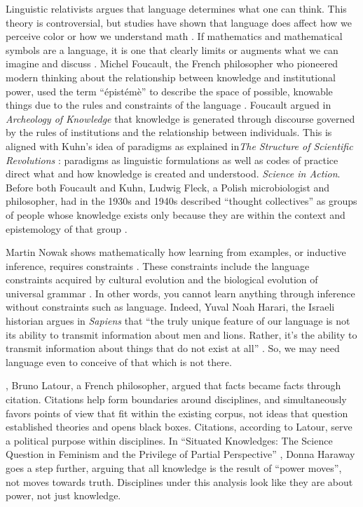 Linguistic relativists argues that language determines what one can think. This theory is controversial, but studies have shown that language does affect how we perceive color \cite{kay_paul_what_2009} or how we understand math \cite{everett_linguistic_2011, holden_life_2004}. If mathematics and mathematical symbols are a language, it is one that clearly limits or augments what we can imagine and discuss \cite{saxe_cultural_2012}. Michel Foucault, the French philosopher who pioneered modern thinking about the relationship between knowledge and institutional power, used the term ``épistémè'' to describe the space of possible, knowable things due to the rules and constraints of the language \cite{foucault_order_2002}. Foucault argued in \emph{Archeology of Knowledge} \cite{foucault_archaeology_2002} that knowledge is generated through discourse governed by the rules of institutions and the relationship between individuals. This is aligned with Kuhn's idea of paradigms as explained in\emph{The Structure of Scientific Revolutions} \cite{kuhn_structure_1970}: paradigms as linguistic formulations as well as codes of practice direct what and how knowledge is created and understood. \emph{Science in Action}. Before both Foucault and Kuhn, Ludwig Fleck, a Polish microbiologist and philosopher, had in the 1930s and 1940s described ``thought collectives'' as groups of people whose knowledge exists only because they are within the context and epistemology of that group \cite{fleck_entstehung_1979}.

Martin Nowak shows mathematically how learning from examples, or inductive inference, requires constraints \cite{nowak_computational_2002}. These constraints include the language constraints acquired by cultural evolution and the biological evolution of universal grammar \cite{chomsky_minimalist_1995}. In other words, you cannot learn anything through inference without constraints such as language. Indeed, Yuval Noah Harari, the Israeli historian argues in \textit{Sapiens} that ``the truly unique feature of our language is not its ability to transmit information about men and lions. Rather, it's the ability to transmit information about things that do not exist at all'' \cite{harari_sapiens:_2015}. So, we may need language even to conceive of that which is not there.

 \cite{latour_science_1987}, Bruno Latour, a French philosopher, argued that facts became facts through citation. Citations help form boundaries around disciplines, and simultaneously favors points of view that fit within the existing corpus, not ideas that question established theories and opens black boxes. Citations, according to Latour, serve a political purpose within disciplines. In ``Situated Knowledges: The Science Question in Feminism and the Privilege of Partial Perspective'' \cite{haraway_situated_1988}, Donna Haraway goes a step further, arguing that all knowledge is the result of ``power moves'', not moves towards truth. Disciplines under this analysis look like they are about power, not just knowledge.

